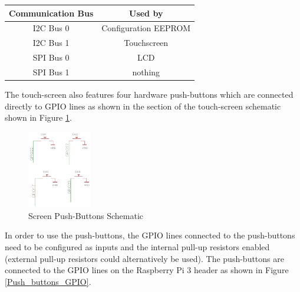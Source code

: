 \documentclass{article}
\begin{document}
	\begin{table}
		\centering
		
		\begin{tabular}[H]{| c | c |}
			\hline
			\textbf{Communication Bus} & \textbf{Used by} \\
			\hline
			I2C Bus 0 & Configuration EEPROM \\
			\hline
			I2C Bus 1 & Touchscreen \\
			\hline
			SPI Bus 0 & LCD \\
			\hline
			SPI Bus 1 & nothing \\
			\hline
		\end{tabular}
	\end{table}


The touch-screen also features four hardware push-buttons which are connected directly to GPIO lines as shown in the section of the touch-screen schematic shown in Figure \ref{Push_buttons_schematic}.


	\begin{figure}[H]
		\centering
		\includegraphics[width=0.25\textwidth]{pics/PiTFT_2-8_push-buttons_section_schematic.png}
		\caption{Screen Push-Buttons Schematic}
		\label{Push_buttons_schematic}
	\end{figure}


In order to use the push-buttons, the GPIO lines connected to the push-buttons need to be configured as inputs and the internal pull-up resistors enabled (external pull-up resistors could alternatively be used). The push-buttons are connected to the GPIO lines on the Raspberry Pi 3 header as shown in Figure \ref{Push_buttons_GPIO}.
\end{document}
